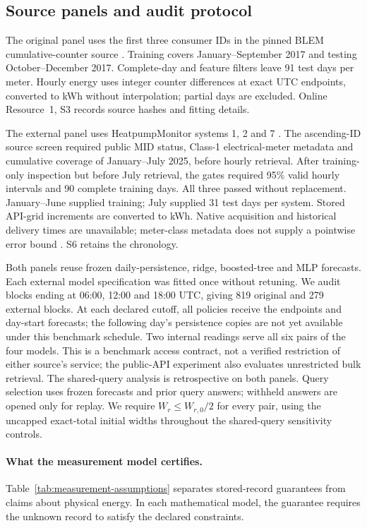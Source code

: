 \documentclass[12pt]{article}
\begin{document}
\FloatBarrier
\subsection{Source panels and audit protocol}
\label{sec:joint-protocol-summary}
The original panel uses the first three consumer IDs in the pinned BLEM
cumulative-counter source \citep{blem}. Training covers January--September
2017 and testing October--December 2017. Complete-day and feature filters
leave 91 test days per meter. Hourly energy uses integer counter differences
at exact UTC endpoints, converted to kWh without interpolation; partial days
are excluded. Online Resource~1, S3 records source hashes and fitting details.

The external panel uses HeatpumpMonitor systems 1, 2 and 7
\citep{hpmabout,hpmapi}. The ascending-ID source screen required public MID
status, Class-1 electrical-meter metadata and cumulative coverage of
January--July 2025, before hourly retrieval. After training-only inspection
but before July retrieval, the gates required 95\% valid hourly intervals
and 90 complete training days. All three passed without replacement.
January--June supplied training; July supplied 31 test days per system.
Stored API-grid increments are converted to kWh. Native acquisition and
historical delivery times are unavailable; meter-class metadata does not
supply a pointwise error bound \citep{hpmcode}. S6 retains the chronology.

Both panels reuse frozen daily-persistence, ridge, boosted-tree and MLP
forecasts. Each external model specification was fitted once without
retuning. We audit blocks ending at 06:00, 12:00 and 18:00 UTC, giving
819 original and 279 external blocks. At each declared cutoff, all policies
receive the endpoints and day-start forecasts; the following day's
persistence copies are not yet available under this benchmark schedule.
Two internal readings serve all six pairs of the four models. This is a
benchmark access contract, not a verified restriction of either source's service;
the public-API experiment also evaluates unrestricted bulk retrieval.
The shared-query analysis is retrospective on both panels. Query selection
uses frozen forecasts and prior query answers; withheld answers are opened
only for replay. We require $W_r\leq W_{r,0}/2$ for every pair, using the
uncapped exact-total initial widths throughout the shared-query sensitivity controls.
\paragraph{What the measurement model certifies.}
Table~\ref{tab:measurement-assumptions} separates stored-record guarantees
from claims about physical energy. In each mathematical model, the guarantee
requires the unknown record to satisfy the declared constraints.
\end{document}
